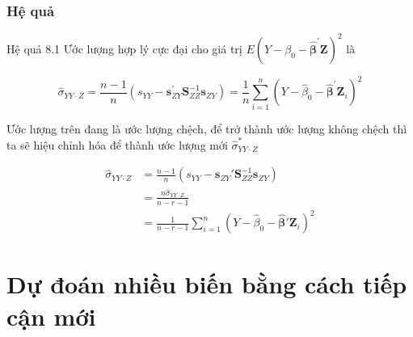 \begin{frame}
\frametitle{Hệ quả }
\begin{block}
    

Hệ quả 8.1
Ước lượng hợp lý cực đại cho giá trị $E\left(Y-\beta_0-\widehat{\boldsymbol{\beta}}^{\prime} \boldsymbol{Z}\right)^2$ là

$$
\widehat{\sigma}_{Y Y \cdot Z}=\frac{n-1}{n}\left(s_{Y Y}-\boldsymbol{s}_{Z Y}^{\prime} \boldsymbol{S}_{Z Z}^{-1} \boldsymbol{s}_{Z Y}\right)
=\frac{1}{n} \sum_{i=1}^n\left(Y-\widehat{\beta}_0-\widehat{\boldsymbol{\beta}}^{\prime} \boldsymbol{Z}_i\right)^2
$$


Ước lượng trên đang là ước 
lượng chệch, để trở thành ước lượng không chệch thì ta sẽ hiệu chỉnh hóa để thành ước lượng mới $\widehat{\sigma}_{Y Y \cdot Z}^*$

\begin{footnotesize}
        \begin{align*}
            \widehat{\sigma}_{YY \cdot Z} &= \frac{n-1}{n} \left( s_{YY} - \mathbf{s}_{ZY}' \mathbf{S}_{ZZ}^{-1} \mathbf{s}_{ZY} \right)  \\ 
            &=\frac{n \widehat{\sigma}_{YY \cdot Z}}{n-r-1}\\
            &= \frac{1}{n-r-1} \sum_{i=1}^n \left( Y - \hat{\beta}_0 - \hat{\boldsymbol{\beta}}' \mathbf{Z}_i \right)^2
        \end{align*}
    \end{footnotesize}
\end{block}
\end{frame}

\section{Dự đoán nhiều biến bằng cách tiếp cận mới}


